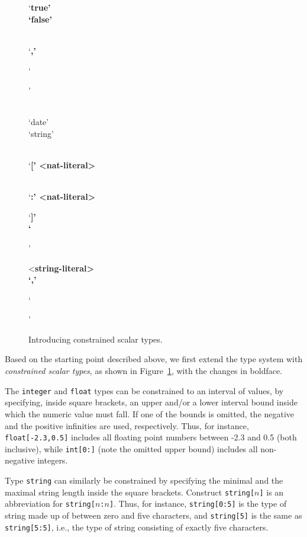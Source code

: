 \documentclass[droidmono,libertine,twoside,user,unofficial]{ecarticle}
\begin{document}
\begin{figure}[t]
\begin{syntdiag}
\begin{stack}
\begin{stack}
{\begin{rep}
            \begin{stack}
              `\bfseries true' \\ `\bfseries false'
            \end{stack}
            \\
            `\bfseries,'
          \end{rep}
          `\bfseries }'
      \end{stack}
      \\
      `date'
      \\
      `string'
      \begin{stack}
        \\
        `\bfseries [' <\bfseries nat-literal>
        \begin{stack}
          \\
          `\bfseries :' <\bfseries nat-literal>
        \end{stack}
        `\bfseries ]'
        \\
        `\bfseries {'
          \begin{rep}
            <\bfseries string-literal>
            \\
            `\bfseries ,'
          \end{rep}
          `\bfseries }'
      \end{stack}
    \end{stack}
  \end{syntdiag}

  \caption{Introducing constrained scalar types.}
  \label{fig:constrained-type-grammar}
\end{figure}

Based on the starting point described above, we first extend the type
system with \emph{constrained scalar types}, as shown in
Figure~\ref{fig:constrained-type-grammar}, with the changes in
boldface.

The \texttt{integer} and \texttt{float} types can be constrained to an
interval of values, by specifying, inside square brackets, an upper
and/or a lower interval bound inside which the numeric value must
fall.  If one of the bounds is omitted, the negative and
the positive infinities are used, respectively.  Thus, for instance,
\texttt{float[-2.3,0.5]} includes all floating point numbers between
-2.3 and 0.5 (both inclusive), while \texttt{int[0:]} (note the
omitted upper bound) includes all non-negative integers.

Type \texttt{string} can similarly be constrained by specifying the
minimal and the maximal string length inside the square brackets.
Construct \texttt{string[$n$]} is an abbreviation for
\texttt{string[$n$:$n$]}.  Thus, for instance, \texttt{string[0:5]} is
the type of string made up of between zero and five characters, and
\texttt{string[5]} is the same as \texttt{string[5:5]}, i.e., the type
of string consisting of exactly five characters.
\end{document}
